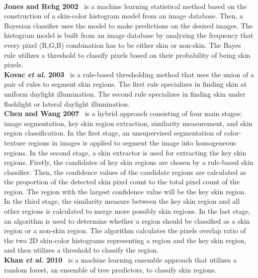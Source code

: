 \\
\textbf{Jones and Rehg 2002}~\cite{jones2002statistical} is a machine learning statistical method based on the construction of a skin-color histogram model from an image database.
Then, a Bayesian classifier uses the model to make predictions on the desired images. The histogram model is built from an image database by analyzing the frequency that every pixel (R,G,B) combination has to be either skin or non-skin.
The Bayes rule utilizes a threshold to classify pixels based on their probability of being skin pixels.\\
\textbf{Kovac \textit{et al.} 2003}~\cite{kovac2003human} is a rule-based thresholding method that uses the union of a pair of rules to segment skin regions.
The first rule specializes in finding skin at uniform daylight illumination.
The second rule specializes in finding skin under flashlight or lateral daylight illumination.\\
\textbf{Chen and Wang 2007}~\cite{chen2007region} is a hybrid approach consisting of four main stages: image segmentation, key skin region extraction, similarity measurement, and skin region classification.
In the first stage, an unsupervised segmentation of color-texture regions in images is applied to segment the image into homogeneous regions.
In the second stage, a skin extractor is used for extracting the key skin regions. Firstly, the candidates of key skin regions are chosen by a rule-based skin classifier.
Then, the confidence values of the candidate regions are calculated as the proportion of the detected skin pixel count to the total pixel count of the region. The region with the largest confidence value will be the key skin region.
In the third stage, the similarity measure between the key skin region and all other regions is calculated to merge more possibly skin regions.
In the last stage, an algorithm is used to determine whether a region should be classified as a skin region or a non-skin region.
The algorithm calculates the pixels overlap ratio of the two 2D skin-color histograms representing a region and the key skin region, and then utilizes a threshold to classify the region.\\
\textbf{Khan \textit{et al.} 2010}~\cite{khan2010skin} is a machine learning ensemble approach that utilizes a random forest, an ensemble of tree predictors, to classify skin regions.
